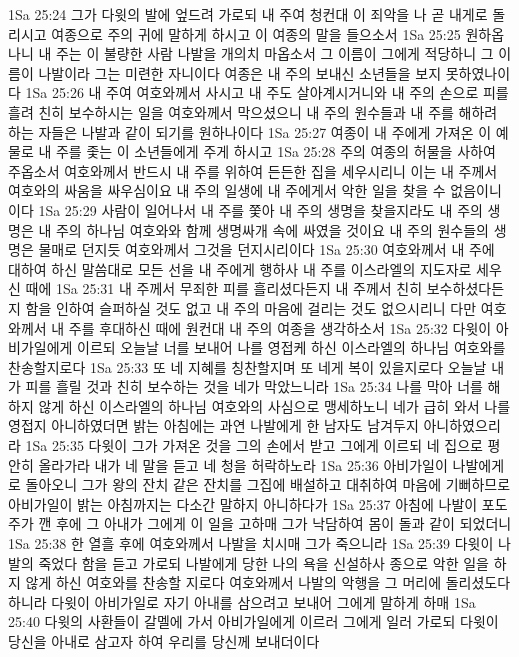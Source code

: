 1Sa 25:24  그가 다윗의 발에 엎드려 가로되 내 주여 청컨대 이 죄악을 나 곧 내게로 돌리시고 여종으로 주의 귀에 말하게 하시고 이 여종의 말을 들으소서
1Sa 25:25  원하옵나니 내 주는 이 불량한 사람 나발을 개의치 마옵소서 그 이름이 그에게 적당하니 그 이름이 나발이라 그는 미련한 자니이다 여종은 내 주의 보내신 소년들을 보지 못하였나이다
1Sa 25:26  내 주여 여호와께서 사시고 내 주도 살아계시거니와 내 주의 손으로 피를 흘려 친히 보수하시는 일을 여호와께서 막으셨으니 내 주의 원수들과 내 주를 해하려 하는 자들은 나발과 같이 되기를 원하나이다
1Sa 25:27  여종이 내 주에게 가져온 이 예물로 내 주를 좇는 이 소년들에게 주게 하시고
1Sa 25:28  주의 여종의 허물을 사하여 주옵소서 여호와께서 반드시 내 주를 위하여 든든한 집을 세우시리니 이는 내 주께서 여호와의 싸움을 싸우심이요 내 주의 일생에 내 주에게서 악한 일을 찾을 수 없음이니이다
1Sa 25:29  사람이 일어나서 내 주를 쫓아 내 주의 생명을 찾을지라도 내 주의 생명은 내 주의 하나님 여호와와 함께 생명싸개 속에 싸였을 것이요 내 주의 원수들의 생명은 물매로 던지듯 여호와께서 그것을 던지시리이다
1Sa 25:30  여호와께서 내 주에 대하여 하신 말씀대로 모든 선을 내 주에게 행하사 내 주를 이스라엘의 지도자로 세우신 때에
1Sa 25:31  내 주께서 무죄한 피를 흘리셨다든지 내 주께서 친히 보수하셨다든지 함을 인하여 슬퍼하실 것도 없고 내 주의 마음에 걸리는 것도 없으시리니 다만 여호와께서 내 주를 후대하신 때에 원컨대 내 주의 여종을 생각하소서
1Sa 25:32  다윗이 아비가일에게 이르되 오늘날 너를 보내어 나를 영접케 하신 이스라엘의 하나님 여호와를 찬송할지로다
1Sa 25:33  또 네 지혜를 칭찬할지며 또 네게 복이 있을지로다 오늘날 내가 피를 흘릴 것과 친히 보수하는 것을 네가 막았느니라
1Sa 25:34  나를 막아 너를 해하지 않게 하신 이스라엘의 하나님 여호와의 사심으로 맹세하노니 네가 급히 와서 나를 영접지 아니하였더면 밝는 아침에는 과연 나발에게 한 남자도 남겨두지 아니하였으리라
1Sa 25:35  다윗이 그가 가져온 것을 그의 손에서 받고 그에게 이르되 네 집으로 평안히 올라가라 내가 네 말을 듣고 네 청을 허락하노라
1Sa 25:36  아비가일이 나발에게로 돌아오니 그가 왕의 잔치 같은 잔치를 그집에 배설하고 대취하여 마음에 기뻐하므로 아비가일이 밝는 아침까지는 다소간 말하지 아니하다가
1Sa 25:37  아침에 나발이 포도주가 깬 후에 그 아내가 그에게 이 일을 고하매 그가 낙담하여 몸이 돌과 같이 되었더니
1Sa 25:38  한 열흘 후에 여호와께서 나발을 치시매 그가 죽으니라
1Sa 25:39  다윗이 나발의 죽었다 함을 듣고 가로되 나발에게 당한 나의 욕을 신설하사 종으로 악한 일을 하지 않게 하신 여호와를 찬송할 지로다 여호와께서 나발의 악행을 그 머리에 돌리셨도다 하니라 다윗이 아비가일로 자기 아내를 삼으려고 보내어 그에게 말하게 하매
1Sa 25:40  다윗의 사환들이 갈멜에 가서 아비가일에게 이르러 그에게 일러 가로되 다윗이 당신을 아내로 삼고자 하여 우리를 당신께 보내더이다
